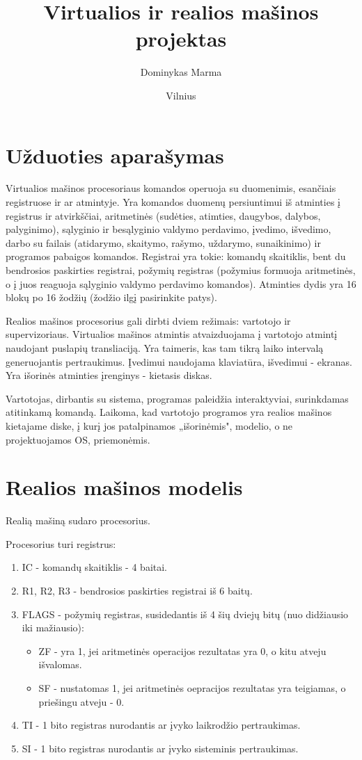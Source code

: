 \documentclass{VUMIFInfKursinis}
\institute{Informatikos institutas}  %
\title{Virtualios ir realios mašinos projektas}
\author{Dominykas Marma}
\date{Vilnius \\ \the\year}
\begin{document}
\maketitle

\tableofcontents

\section{Užduoties aparašymas}

Virtualios mašinos procesoriaus komandos operuoja su duomenimis, esančiais registruose ir ar atmintyje. Yra komandos duomenų persiuntimui iš atminties į registrus ir atvirkščiai, aritmetinės (sudėties, atimties, daugybos, dalybos, palyginimo), sąlyginio ir besąlyginio valdymo perdavimo, įvedimo, išvedimo, darbo su failais (atidarymo, skaitymo, rašymo, uždarymo, sunaikinimo) ir programos pabaigos komandos. Registrai yra tokie: komandų skaitiklis, bent du bendrosios paskirties registrai, požymių registras (požymius formuoja aritmetinės, o į juos reaguoja sąlyginio valdymo perdavimo komandos). Atminties dydis yra 16 blokų po 16 žodžių (žodžio ilgį pasirinkite patys).


Realios mašinos procesorius gali dirbti dviem režimais: vartotojo ir supervizoriaus. Virtualios mašinos atmintis atvaizduojama į vartotojo atmintį naudojant puslapių transliaciją. Yra taimeris, kas tam tikrą laiko intervalą generuojantis pertraukimus. Įvedimui naudojama klaviatūra, išvedimui - ekranas. Yra išorinės atminties įrenginys - kietasis diskas.

Vartotojas, dirbantis su sistema, programas paleidžia interaktyviai, surinkdamas atitinkamą komandą. Laikoma, kad vartotojo programos yra realios mašinos kietajame diske, į kurį jos patalpinamos „išorinėmis", modelio, o ne projektuojamos OS, priemonėmis.

\section{Realios mašinos modelis}

Realią mašiną sudaro procesorius.

Procesorius turi registrus:

\begin{enumerate}
	\item IC - komandų skaitiklis - 4 baitai.
	\item R1, R2, R3 - bendrosios paskirties registrai iš 6 baitų.
	\item FLAGS - požymių  registras, susidedantis iš 4 šių dviejų bitų (nuo didžiausio iki mažiausio): 
	\begin{itemize}
		\item ZF - yra 1, jei aritmetinės operacijos rezultatas yra 0, o kitu atveju išvalomas.
		\item SF - nustatomas 1, jei aritmetinės oepracijos rezultatas yra teigiamas, o priešingu atveju - 0.
	\end{itemize}
	\item TI - 1 bito registras nurodantis ar įvyko laikrodžio pertraukimas.
	\item SI - 1 bito registras nurodantis ar įvyko sisteminis pertraukimas.
\end{enumerate}
\end{document}
